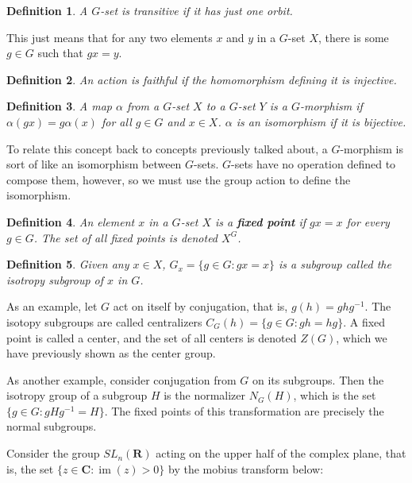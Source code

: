 \documentclass[12pt]{report}
\newtheorem{definition}{Definition}
\DeclareMathOperator{\im}{im}
\begin{document}
\begin{definition}
    A $G$-set is transitive if it has just one orbit.
\end{definition}

This just means that for any two elements $x$ and $y$ in a $G$-set $X$, there is some $g \in G$ such that $gx = y$.

\begin{definition}
    An action is faithful if the homomorphism defining it is injective.
\end{definition}

\begin{definition}
    A map $\alpha$ from a  $G$-set $X$ to a $G$-set $Y$ is a $G$-morphism if $\alpha(gx) = g\alpha(x)$ for all $g \in G$ and $x \in X$. $\alpha$ is an isomorphism if it is bijective.
\end{definition}

To relate this concept back to concepts previously talked about, a $G$-morphism is sort of like an isomorphism between $G$-sets. $G$-sets have no operation defined to compose them, however, so we must use the group action to define the isomorphism.

\begin{definition}
    An element $x$ in a $G$-set $X$ is a {\bf fixed point} if $gx = x$ for every $g \in G$. The set of all fixed points is denoted $X^G$.
\end{definition}

\begin{definition}
    Given any $x \in X$, $G_x = \{ g \in G : gx = x \}$ is a subgroup called the isotropy subgroup of $x$ in $G$.
\end{definition}

As an example, let $G$ act on itself by conjugation, that is, $g(h) = ghg^{-1}$. The isotopy subgroups are called centralizers $C_G(h) = \{ g \in G : gh = hg \}$. A fixed point is called a center, and the set of all centers is denoted $Z(G)$, which we have previously shown as the center group.

As another example, consider conjugation from $G$ on its subgroups. Then the isotropy group of a subgroup $H$ is the normalizer $N_G(H)$, which is the set $\{ g \in G : gHg^{-1} = H \}$. The fixed points of this transformation are precisely the normal subgroups.

Consider the group $SL_n(\mathbf{R})$ acting on the upper half of the complex plane, that is, the set $\{ z \in \mathbf{C} : \im(z) > 0 \}$ by the mobius transform below:
\end{document}
